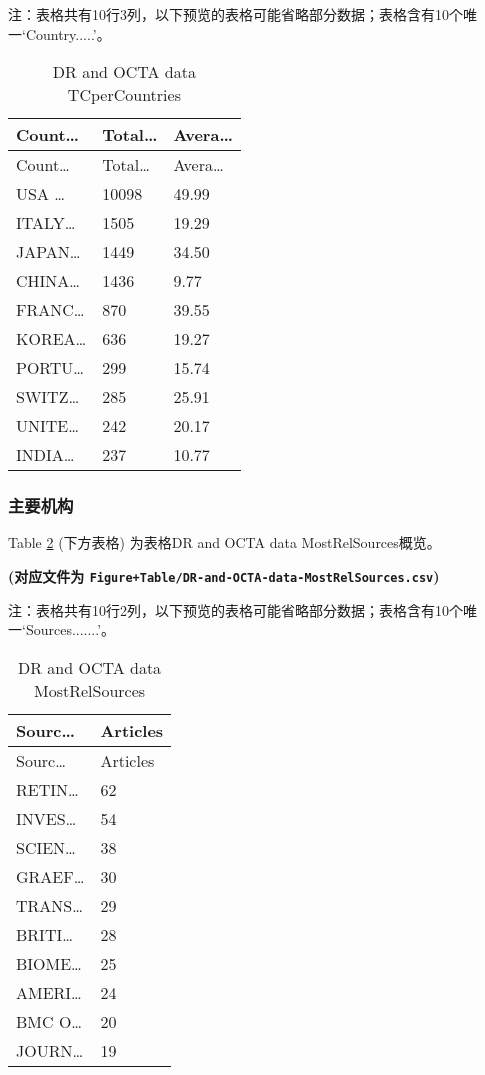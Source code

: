 \documentclass[
]{article}
\begin{document}
\begin{center}\begin{tcolorbox}[colback=gray!10, colframe=gray!50, width=0.9\linewidth, arc=1mm, boxrule=0.5pt]注：表格共有10行3列，以下预览的表格可能省略部分数据；表格含有10个唯一`Country.....'。
\end{tcolorbox}
\end{center}

\begin{longtable}[]{@{}lll@{}}
\caption{\label{tab:DR-and-OCTA-data-TCperCountries}DR and OCTA data TCperCountries}\tabularnewline
\toprule
Count\ldots{} & Total\ldots{} & Avera\ldots{}\tabularnewline
\midrule
\endfirsthead
\toprule
Count\ldots{} & Total\ldots{} & Avera\ldots{}\tabularnewline
\midrule
\endhead
USA \ldots{} & 10098 & 49.99\tabularnewline
ITALY\ldots{} & 1505 & 19.29\tabularnewline
JAPAN\ldots{} & 1449 & 34.50\tabularnewline
CHINA\ldots{} & 1436 & 9.77\tabularnewline
FRANC\ldots{} & 870 & 39.55\tabularnewline
KOREA\ldots{} & 636 & 19.27\tabularnewline
PORTU\ldots{} & 299 & 15.74\tabularnewline
SWITZ\ldots{} & 285 & 25.91\tabularnewline
UNITE\ldots{} & 242 & 20.17\tabularnewline
INDIA\ldots{} & 237 & 10.77\tabularnewline
\bottomrule
\end{longtable}

\hypertarget{ux4e3bux8981ux673aux6784}{%
\subsubsection{主要机构}\label{ux4e3bux8981ux673aux6784}}

Table \ref{tab:DR-and-OCTA-data-MostRelSources} (下方表格) 为表格DR and OCTA data MostRelSources概览。

\textbf{(对应文件为 \texttt{Figure+Table/DR-and-OCTA-data-MostRelSources.csv})}

\begin{center}\begin{tcolorbox}[colback=gray!10, colframe=gray!50, width=0.9\linewidth, arc=1mm, boxrule=0.5pt]注：表格共有10行2列，以下预览的表格可能省略部分数据；表格含有10个唯一`Sources.......'。
\end{tcolorbox}
\end{center}

\begin{longtable}[]{@{}ll@{}}
\caption{\label{tab:DR-and-OCTA-data-MostRelSources}DR and OCTA data MostRelSources}\tabularnewline
\toprule
Sourc\ldots{} & Articles\tabularnewline
\midrule
\endfirsthead
\toprule
Sourc\ldots{} & Articles\tabularnewline
\midrule
\endhead
RETIN\ldots{} & 62\tabularnewline
INVES\ldots{} & 54\tabularnewline
SCIEN\ldots{} & 38\tabularnewline
GRAEF\ldots{} & 30\tabularnewline
TRANS\ldots{} & 29\tabularnewline
BRITI\ldots{} & 28\tabularnewline
BIOME\ldots{} & 25\tabularnewline
AMERI\ldots{} & 24\tabularnewline
BMC O\ldots{} & 20\tabularnewline
JOURN\ldots{} & 19\tabularnewline
\bottomrule
\end{longtable}
\end{document}
